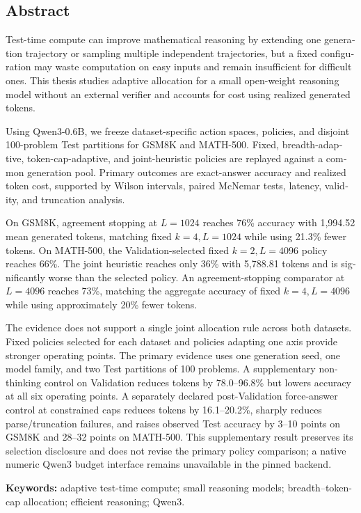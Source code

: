 \begin{otherlanguage}{english}
\chapter*{Abstract}

Test-time compute can improve mathematical reasoning by extending one
generation trajectory or sampling multiple independent trajectories, but a
fixed configuration may waste computation on easy inputs and remain
insufficient for difficult ones. This thesis studies adaptive allocation for a
small open-weight reasoning model without an external verifier and accounts
for cost using realized generated tokens.

Using Qwen3-0.6B, we freeze dataset-specific action spaces, policies, and
disjoint 100-problem Test partitions for GSM8K and MATH-500. Fixed,
breadth-adaptive, token-cap-adaptive, and joint-heuristic policies are replayed
against a common generation pool. Primary outcomes are exact-answer accuracy
and realized token cost, supported by Wilson intervals, paired McNemar tests,
latency, validity, and truncation analysis.

On GSM8K, agreement stopping at $L=1024$ reaches 76\% accuracy with 1,994.52
mean generated tokens, matching fixed $k=4,L=1024$ while using 21.3\% fewer
tokens. On MATH-500, the Validation-selected fixed $k=2,L=4096$ policy reaches
66\%. The joint heuristic reaches only 36\% with 5,788.81 tokens and is
significantly worse than the selected policy. An agreement-stopping comparator
at $L=4096$ reaches 73\%, matching the aggregate accuracy of fixed
$k=4,L=4096$ while using approximately 20\% fewer tokens.

The evidence does not support a single joint allocation rule across both
datasets. Fixed policies selected for each dataset and policies adapting one
axis provide stronger operating points. The primary evidence uses one
generation seed, one model family, and two Test partitions of 100 problems.
A supplementary non-thinking control on Validation reduces tokens by
78.0--96.8\% but lowers accuracy at all six operating points. A separately
declared post-Validation force-answer control at constrained caps reduces
tokens by 16.1--20.2\%, sharply reduces parse/truncation failures, and raises
observed Test accuracy by 3--10 points on GSM8K and 28--32 points on MATH-500.
This supplementary result preserves its selection disclosure and does not
revise the primary policy comparison; a native numeric Qwen3 budget interface
remains unavailable in the pinned backend.

\noindent\textbf{Keywords:} adaptive test-time compute; small reasoning models;
breadth--token-cap allocation; efficient reasoning; Qwen3.
\end{otherlanguage}
